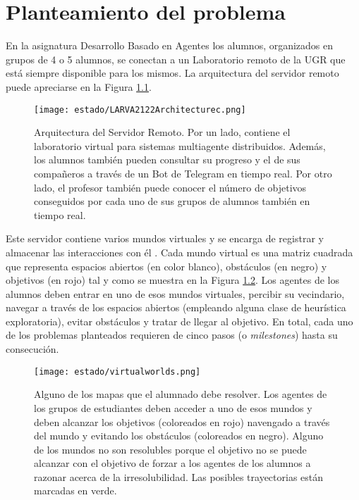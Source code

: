 \chapter{Planteamiento del problema}\label{sec:chapterI}

En la asignatura Desarrollo Basado en Agentes los alumnos, organizados en grupos de 4 o 5 alumnos, se conectan a un Laboratorio remoto de la UGR que está siempre disponible para los mismos. La arquitectura del servidor remoto puede apreciarse en la Figura \ref{fig:architecture}.

\begin{figure}[H]
    \centering
    \texttt{[image: estado/LARVA2122Architecturec.png]}
    \caption{Arquitectura del Servidor Remoto. Por un lado, contiene el laboratorio virtual para sistemas multiagente distribuidos. Además, los alumnos también pueden consultar su progreso y el de sus compañeros a través de un Bot de Telegram en tiempo real. Por otro lado, el profesor también puede conocer el número de objetivos conseguidos por cada uno de sus grupos de alumnos también en tiempo real.}
    \label{fig:architecture}
\end{figure}

Este servidor contiene varios mundos virtuales y se encarga de registrar y almacenar las interacciones con él \cite{Vidal_2016}. Cada mundo virtual es una matriz cuadrada que representa espacios abiertos (en color blanco), obstáculos (en negro) y objetivos (en rojo) tal y como se muestra en la Figura \ref{fig:map}. Los agentes de los alumnos deben entrar en uno de esos mundos virtuales, percibir su vecindario, navegar a través de los espacios abiertos (empleando alguna clase de heurística exploratoria), evitar obstáculos y tratar de llegar al objetivo. En total, cada uno de los problemas planteados requieren de cinco pasos (o \emph{milestones}) hasta su consecución.

\begin{figure}[H]
    \centering
    \texttt{[image: estado/virtualworlds.png]}
    \caption{Alguno de los mapas que el alumnado debe resolver. Los agentes de los grupos de estudiantes deben acceder a uno de esos mundos y deben alcanzar los objetivos (coloreados en rojo) navengado a través del mundo y evitando los obstáculos (coloreados en negro). Alguno de los mundos no son resolubles porque el objetivo no se puede alcanzar con el objetivo de forzar a los agentes de los alumnos a razonar acerca de la irresolubilidad. Las posibles trayectorias están marcadas en verde.}
    \label{fig:map}
\end{figure}

